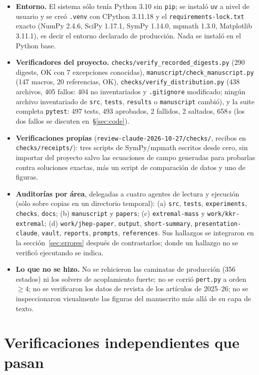 \documentclass[10pt,a4paper]{article}
\newcommand{\code}[1]{\texttt{#1}}
\begin{document}
\begin{itemize}
\item \textbf{Entorno.} El sistema sólo tenía Python 3.10 sin \code{pip}; se instaló \code{uv} a
 nivel de usuario y se creó \code{.venv} con CPython 3.11.18 y el \code{requirements-lock.txt}
 exacto (NumPy 2.4.6, SciPy 1.17.1, SymPy 1.14.0, mpmath 1.3.0, Matplotlib 3.11.1), es decir el
 entorno declarado de producción. Nada se instaló en el Python base.
\item \textbf{Verificadores del proyecto.} \code{checks/verify\_recorded\_digests.py} (290
 digests, OK con 7 excepciones conocidas), \code{manuscript/check\_manuscript.py} (147 macros, 20
 referencias, OK), \code{checks/verify\_distribution.py} (438 archivos, 405 fallos: 404 no
 inventariados y \code{.gitignore} modificado; ningún archivo inventariado de \code{src}, \code{tests},
 \code{results} o \code{manuscript} cambió), y la suite completa \code{pytest}: 497 tests, 493
 aprobados, 2 fallidos, 2 saltados, 658\,s (los dos fallos se discuten en~\S\ref{sec:code}).
\item \textbf{Verificaciones propias} (\code{review-claude-2026-10-27/checks/}, recibos en
 \code{checks/receipts/}): tres scripts de SymPy/mpmath escritos desde cero, sin importar del
 proyecto salvo las ecuaciones de campo generadas para probarlas contra soluciones exactas, más un
 script de comparación de datos y uno de figuras.
\item \textbf{Auditorías por área}, delegadas a cuatro agentes de lectura y ejecución (sólo sobre
 copias en un directorio temporal): (a) \code{src}, \code{tests}, \code{experiments},
 \code{checks}, \code{docs}; (b) \code{manuscript} y \code{papers}; (c) \code{extremal-mass} y
 \code{work/kkr-extremal}; (d) \code{work/jhep-paper}, \code{output}, \code{short-summary},
 \code{presentation-claude}, \code{vault}, \code{reports}, \code{prompts}, \code{references}.
 Sus hallazgos se integraron en la sección~\ref{sec:errores} después de contrastarlos; donde un
 hallazgo no se verificó ejecutando se indica.
\item \textbf{Lo que no se hizo.} No se rehicieron las caminatas de producción (356 estados) ni los
 solvers de acoplamiento fuerte; no se corrió \code{pert.py} a orden $\ge4$; no se verificaron los
 datos de revista de los artículos de 2025--26; no se inspeccionaron visualmente las figuras del
 manuscrito más allá de su capa de texto.
\end{itemize}

\section{Verificaciones independientes que pasan}
\label{sec:verif}
\end{document}
